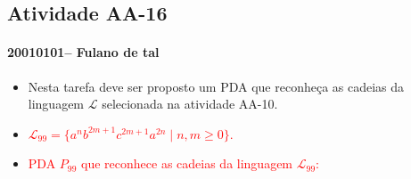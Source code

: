 \documentclass[12pt]{article}
\def\discente{Fulano de tal}
\def\matricula{20010101}
\def\aa{16}
\def\myling{{99}} %
\begin{document}
\subsection*{Atividade AA-\aa}
 \paragraph{\matricula -- \discente}
 \begin{itemize}
% 
  \item Nesta tarefa deve ser proposto um PDA que reconheça as cadeias da linguagem $\mathcal{L}$ selecionada na atividade AA-10.
  \item \textcolor{red}{$\mathcal{L}_{\myling} = \{a^nb^{2m+1}c^{2m+1}a^{2n} \mid n,m \geqslant 0\}$.}
  \item  \textcolor{red}{PDA $P_{\myling}$ que reconhece as cadeias da linguagem $\mathcal{L}_{\myling}$:}
  \end{itemize}
\end{document}
